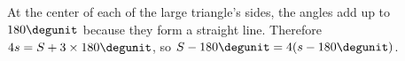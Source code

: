       At the center of each of the
      large triangle's sides, the angles add up to $180\degunit$ because they form a straight line. Therefore $4s=S+3\times180\degunit$,
      so $S-180\degunit=4(s-180\degunit)$.


